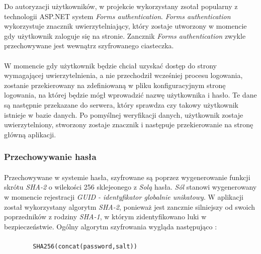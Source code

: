 Do autoryzacji użytkowników, w projekcie wykorzystany zsotał popularny z technologii ASP.NET system \textit{Forms authentication}. \textit{Forms authentication} wykorzystuje znacznik uwierzytelniający, który zostaje utworzony w momencie gdy użytkownik zaloguje się na stronie. Zancznik \textit{Forms authentication} zwykle przechowywane jest wewnątrz szyfrowanego ciasteczka.

\paragraph{} %
\label{par:}
W momencie gdy użytkownik będzie chciał uzyskać dostęp do strony wymagającej uwierzytelnienia, a nie przechodził wcześniej procesu logowania, zostanie przekierowany na zdefiniowaną w pliku konfiguracyjnym stronę logowania, na której będzie mógł wprowadzić nazwę użytkownika i hasło. Te dane są następnie przekazane do serwera, który sprawdza czy takowy użytkownik istnieje w bazie danych. Po pomyślnej weryfikacji danych, użytkownik zostaje uwierzytelniony, stworzony zostaje znacznik i następuje przekierowanie na stronę główną aplikacji.

\subsubsection{Przechowywanie hasła}
\paragraph{} %
\label{par:}
Przechowywane w systemie hasła, szyfrowane są poprzez wygenerowanie funkcji skrótu \textit{SHA-2} o wilekości 256 sklejeonego z \textit{Solą} hasła. \textit{Sól} stanowi wygenerowany w momencie rejestracji \textit{GUID - identyfikator globalnie unikatowy}. W aplikacji został wykorzystany algorytm \textit{SHA-2}, ponieważ jest zancznie silniejszy od swoich poprzedników z rodziny \textit{SHA-1}, w którym zidentyfikowano luki w bezpieczeństwie. Ogólny algorytm szyfrowania wygląda następująco :

\paragraph{} %
\label{par:}


\begin{lstlisting}
		SHA256(concat(password,salt))
\end{lstlisting}

